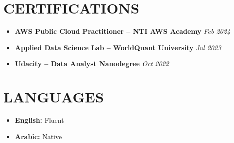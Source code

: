 \documentclass[11pt]{article}
\begin{document}
\section{CERTIFICATIONS}
\begin{itemize}
\item \textbf{AWS Public Cloud Practitioner – NTI AWS Academy} \hfill \textit{Feb 2024}
\item \textbf{Applied Data Science Lab – WorldQuant University} \hfill \textit{Jul 2023}
\item \textbf{Udacity – Data Analyst Nanodegree} \hfill \textit{Oct 2022}
\end{itemize}

\section{LANGUAGES}

\begin{itemize}
\item \textbf{English:} Fluent
\item \textbf{Arabic:} Native
\end{itemize}
\end{document}
